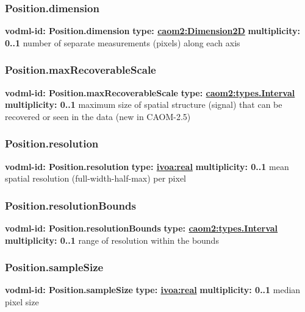     \subsubsection{Position.dimension}
      \textbf{vodml-id: Position.dimension} \newline
      \textbf{type: \hyperref[sect:Dimension2D]{caom2:Dimension2D}} \newline
      \textbf{multiplicity: 0..1} \newline
      number of separate measurements (pixels) along each axis

    \subsubsection{Position.maxRecoverableScale}
      \textbf{vodml-id: Position.maxRecoverableScale} \newline
      \textbf{type: \hyperref[sect:types.Interval]{caom2:types.Interval}} \newline
      \textbf{multiplicity: 0..1} \newline
      maximum size of spatial structure (signal) that can be recovered or seen in the data (new in CAOM-2.5)

    \subsubsection{Position.resolution}
      \textbf{vodml-id: Position.resolution} \newline
      \textbf{type: \hyperref[sect:ivoa]{ivoa:real}} \newline
      \textbf{multiplicity: 0..1} \newline
      mean spatial resolution (full-width-half-max) per pixel

    \subsubsection{Position.resolutionBounds}
      \textbf{vodml-id: Position.resolutionBounds} \newline
      \textbf{type: \hyperref[sect:types.Interval]{caom2:types.Interval}} \newline
      \textbf{multiplicity: 0..1} \newline
      range of resolution within the bounds

    \subsubsection{Position.sampleSize}
      \textbf{vodml-id: Position.sampleSize} \newline
      \textbf{type: \hyperref[sect:ivoa]{ivoa:real}} \newline
      \textbf{multiplicity: 0..1} \newline
      median pixel size

